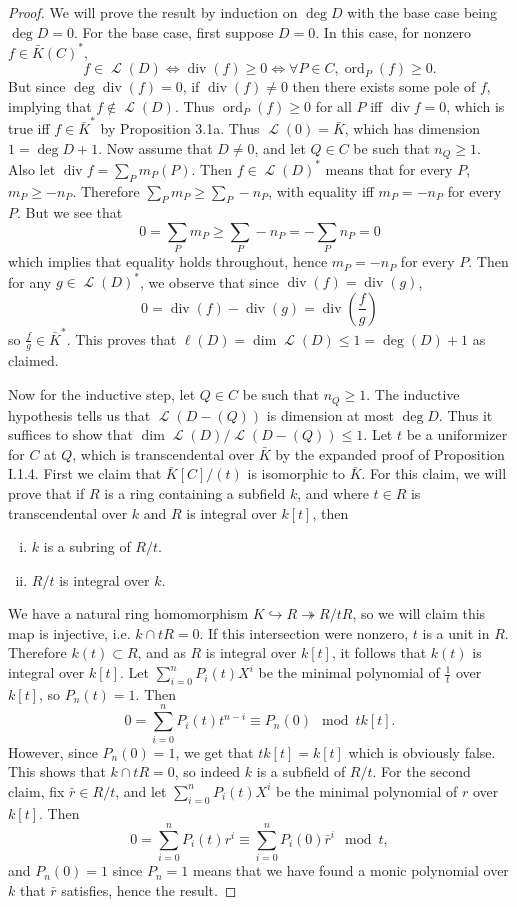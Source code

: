 \documentclass{article}
\theoremstyle{customplain}
\theoremstyle{customdef}
\renewcommand{\div}{\mathop{\mathrm{div}}}
\DeclareMathOperator{\ord}{ord}
\DeclareMathOperator{\calL}{\mathcal{L}}
\theoremstyle{definition} %
\renewcommand{\le}{\leqslant}
\renewcommand{\ge}{\geqslant}
\begin{document}
\begin{proof}
    We will prove the result by induction on $\deg D$ with the base case being $\deg D = 0.$ For the base case, first suppose $D=0.$ In this case, for nonzero $f\in \bar K(C)^*$,
    \[
    f\in \calL(D)\iff \div(f) \ge 0 \iff \forall P\in C, \ord_P(f) \ge 0.
    \]
    But since $\deg \div(f)=0$, if $\div(f) \ne 0$ then there exists some pole of $f$, implying that $f\notin \calL(D).$ Thus $\ord_P(f) \ge 0$ for all $P$ iff $\div f = 0$, which is true iff $f\in \bar K^*$ by Proposition 3.1a. Thus $\calL(0) = \bar K$, which has dimension $1=\deg D+1.$ Now assume that $D\ne 0$, and let $Q\in C$ be such that $n_Q \ge 1.$ Also let $\div f = \sum_P m_P (P).$ Then $f\in \calL(D)^*$ means that for every $P$, $m_P \ge -n_P.$ Therefore $\sum_P m_P \ge \sum_P -n_P$, with equality iff $m_P=-n_P$ for every $P.$ But we see that
    \[
    0 = \sum_P m_P \ge \sum_P - n_P = -\sum_P n_P  = 0
    \]
    which implies that equality holds throughout, hence $m_P=-n_P$ for every $P$. Then for any $g\in \calL(D)^*$, we observe that since $\div(f)= \div(g)$, 
    \[
    0=\div(f)-\div(g)=\div(\frac{f}{g})
    \]
    so $\frac{f}{g}\in \bar K^*$. This proves that $\ell(D)=\dim \calL(D) \le 1= \deg(D)+1$ as claimed.

    Now for the inductive step, let $Q\in C$ be such that $n_Q \ge 1.$ The inductive hypothesis tells us that $\calL(D-(Q))$ is dimension at most $\deg D.$ Thus it suffices to show that $\dim \calL(D)/\calL(D-(Q)) \le 1.$ Let $t$ be a uniformizer for $C$ at $Q$, which is transcendental over $\bar K$ by the expanded proof of Proposition I.1.4. First we claim that $\bar K[C]/(t)$ is isomorphic to $\bar K.$ For this claim, we will prove that if $R$ is a ring containing a subfield $k$, and where $t\in R$ is transcendental over $k$ and $R$ is integral over $k[t]$, then
    \begin{enumerate}[(i)]
        \item $k$ is a subring of $R/t$.
        \item $R/t$ is integral over $k$.
    \end{enumerate}
    We have a natural ring homomorphism $K\hookrightarrow R \twoheadrightarrow R/tR$, so we will claim this map is injective, i.e. $k\cap tR=0.$ If this intersection were nonzero, $t$ is a unit in $R.$ Therefore $k(t)\subset R$, and as $R$ is integral over $k[t]$, it follows that $k(t)$ is integral over $k[t].$ Let $\sum_{i=0}^n P_i(t) X^i$ be the minimal polynomial of $\frac{1}{t}$ over $k[t]$, so $P_n(t)=1.$ Then
    \[
    0=\sum_{i=0}^n P_i(t) t^{n-i}\equiv P_n(0) \mod tk[t].
    \]
    However, since $P_n(0)=1$, we get that $tk[t]=k[t]$ which is obviously false. This shows that $k\cap tR = 0$, so indeed $k$ is a subfield of $R/t$. For the second claim, fix $\bar r \in R/t$, and let $\sum_{i=0}^n P_i(t) X^i$ be the minimal polynomial of $r$ over $k[t].$ Then
    \[
    0=\sum_{i=0}^n P_i(t) r^i \equiv \sum_{i=0}^n P_i(0) \bar r^i \mod t,
    \]
    and $P_n(0)=1$ since $P_n=1$ means that we have found a monic polynomial over $k$ that $\bar r$ satisfies, hence the result.


\end{proof}
\end{document}
